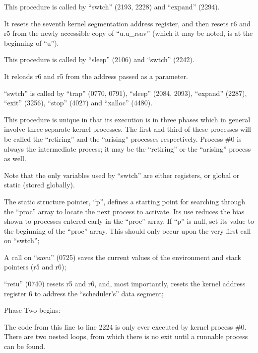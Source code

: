 
This procedure is called by ``swtch''
(2193, 2228) and ``expand'' (2294).

It resets the seventh kernel segmentation address register, and then resets
r6 and r5 from the newly accessible
copy of ``u.u\_rsav'' (which it may be
noted, is at the beginning of ``u'').



This procedure is called by ``sleep''
(2106) and ``swtch'' (2242).

It reloads r6 and r5 from the address
passed as a parameter.


``swtch'' is called by ``trap'' (0770,
0791), ``sleep'' (2084, 2093), ``expand''
(2287), ``exit'' (3256), ``stop'' (4027)
and ``xalloc'' (4480).

This procedure is unique in that its
execution is in three phases which in
general involve three separate kernel
processes. The first and third of
these processes will be called the
``retiring'' and the ``arising'' processes
respectively. Process \#0 is always the
intermediate process; it may be the
``retiring'' or the ``arising'' process as
well.


Note that the only variables used by
``swtch'' are either registers, or global
or static (stored globally).

\bd
\item[2184:] The static structure pointer,
 ``p'', defines a starting point for
 searching through the ``proc''
 array to locate the next process
 to activate. Its use reduces the
 bias shown to processes entered
 early in the ``proc'' array. If ``p''
 is null, set its value to the
 beginning of the ``proc'' array.
 This should only occur upon the
 very first call on ``swtch'';

\item[2189:] A call on ``savu'' (0725) saves the
 current values of the environment
 and stack pointers (r5 and r6);

\item[2193:] ``retu'' (0740) resets r5 and r6,
 and, most importantly, resets the
 kernel address register 6 to
 address the ``scheduler's'' data
 segment;

\item[2195:] Phase Two begins:

 The code from this line to line
 2224 is only ever executed by
 kernel process \#0. There are two
 nested loops, from which there is
 no exit until a runnable process
 can be found.

